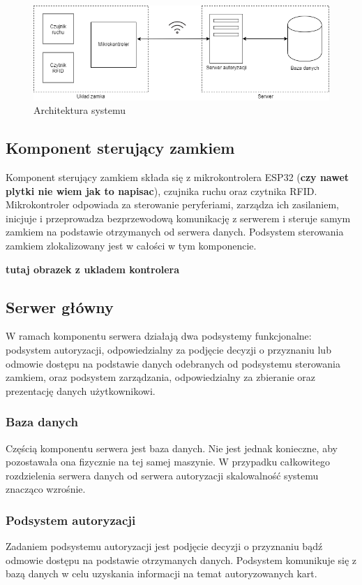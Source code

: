 \begin{figure}[]
        \includegraphics[width=\linewidth]{chapters/images/hl-arch.png}
        \caption{Architektura systemu}
        \label{fig:hl-arch}
\end{figure}

\subsection{Komponent sterujący zamkiem}
Komponent sterujący zamkiem składa się z mikrokontrolera ESP32 (\textbf{czy nawet plytki nie wiem jak to napisac}), czujnika ruchu oraz czytnika RFID. Mikrokontroler odpowiada za sterowanie peryferiami, zarządza ich zasilaniem, inicjuje i przeprowadza bezprzewodową komunikację z serwerem i steruje samym zamkiem na podstawie otrzymanych od serwera danych. Podsystem sterowania zamkiem zlokalizowany jest w całości w tym komponencie.

\textbf{tutaj obrazek z ukladem kontrolera}

\subsection{Serwer główny}
W ramach komponentu serwera działają dwa podsystemy funkcjonalne: podsystem autoryzacji, odpowiedzialny za podjęcie decyzji o przyznaniu lub odmowie dostępu na podstawie danych odebranych od podsystemu sterowania zamkiem, oraz podsystem zarządzania, odpowiedzialny za zbieranie oraz prezentację danych użytkownikowi.

\subsubsection{Baza danych}
Częścią komponentu serwera jest baza danych. Nie jest jednak konieczne, aby pozostawała ona fizycznie na tej samej maszynie. W przypadku całkowitego rozdzielenia serwera danych od serwera autoryzacji skalowalność systemu znacząco wzrośnie.

\subsubsection{Podsystem autoryzacji}
Zadaniem podsystemu autoryzacji jest podjęcie decyzji o przyznaniu bądź odmowie dostępu na podstawie otrzymanych danych. Podsystem komunikuje się z bazą danych w celu uzyskania informacji na temat autoryzowanych kart.


